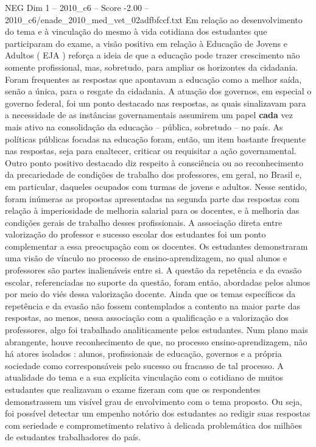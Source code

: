 \begin{textsample}{NEG Dim 1 – 2010\_c6 – Score -2.00 – 2010\_c6/enade\_2010\_med\_vet\_02adfbfccf.txt}
Em relação ao desenvolvimento do tema e à vinculação do mesmo à vida cotidiana dos estudantes que participaram do exame, a visão positiva em relação à Educação de Jovens e Adultos ( EJA ) reforça a ideia de que a educação pode trazer crescimento não somente profissional, mas, sobretudo, para ampliar os horizontes da cidadania.
Foram frequentes as respostas que apontavam a educação como a melhor saída, senão a única, para o resgate da cidadania.
A atuação dos governos, em especial o governo federal, foi um ponto destacado nas respostas, as quais sinalizavam para a necessidade de as instâncias governamentais assumirem um papel \textbf{cada} vez mais ativo na consolidação da educação – pública, sobretudo – no país.
As políticas públicas focadas na educação foram, então, um item bastante frequente nas respostas, seja para enaltecer, criticar ou requisitar a ação governamental.
Outro ponto positivo destacado diz respeito à consciência ou ao reconhecimento da precariedade de condições de trabalho dos professores, em geral, no Brasil e, em particular, daqueles ocupados com turmas de jovens e adultos.
Nesse sentido, foram inúmeras as propostas apresentadas na segunda parte das respostas com relação à imperiosidade de melhoria salarial para os docentes, e à melhoria das condições gerais de trabalho desses profissionais.
A associação direta entre valorização do professor e sucesso escolar dos estudantes foi um ponto complementar a essa preocupação com os docentes.
Os estudantes demonstraram uma visão de vínculo no processo de ensino-aprendizagem, no qual alunos e professores são partes inalienáveis entre si.
A questão da repetência e da evasão escolar, referenciadas no suporte da questão, foram então, abordadas pelos alunos por meio do viés dessa valorização docente.
Ainda que os temas específicos da repetência e da evasão não fossem contemplados a contento na maior parte das respostas, ao menos, nessa associação com a qualificação e a valorização dos professores, algo foi trabalhado analiticamente pelos estudantes.
Num plano mais abrangente, houve reconhecimento de que, no processo ensino-aprendizagem, não há atores isolados : alunos, profissionais de educação, governos e a própria sociedade como corresponsáveis pelo sucesso ou fracasso de tal processo.
A atualidade do tema e a sua explícita vinculação com o cotidiano de muitos estudantes que realizavam o exame fizeram com que os respondentes demonstrassem um visível grau de envolvimento com o tema proposto.
Ou seja, foi possível detectar um empenho notório dos estudantes ao redigir suas respostas com seriedade e comprometimento relativo à delicada problemática dos milhões de estudantes trabalhadores do país.

\end{textsample}
